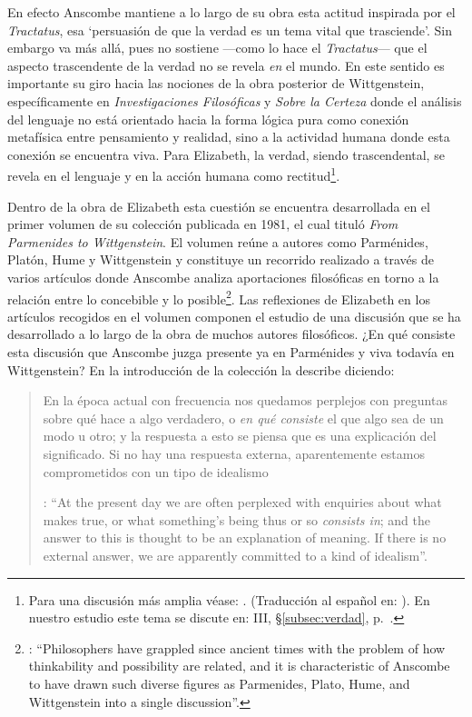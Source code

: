 En efecto Anscombe mantiene a lo largo de su obra esta actitud inspirada por el \emph{Tractatus}, esa \enquote*{persuasión de que la verdad es un tema vital que trasciende}. Sin embargo va más allá, pues no sostiene ---como lo hace el \emph{Tractatus}--- que el aspecto trascendente de la verdad no se revela \emph{en} el mundo. En este sentido es importante su giro hacia las nociones de la obra posterior de Wittgenstein, específicamente en \emph{Investigaciones Filosóficas} y \emph{Sobre la Certeza} donde el análisis del lenguaje no está orientado hacia la forma lógica pura como conexión metafísica entre pensamiento y realidad, sino a la actividad humana donde esta conexión se encuentra viva. Para Elizabeth, la verdad, siendo trascendental, se revela en el lenguaje y en la acción humana como rectitud\footnote{Para una discusión más amplia véase: \Cite{anscombe2011plato:unitytruth}. (Traducción al español en: \Cite{torralbaynubiola2005fayeh:unidadverdad}). En nuestro estudio este tema se discute en: III, \S\ref{subsec:verdad}, p.~\pageref{subsec:verdad}.}.

Dentro de la obra de Elizabeth esta cuestión se encuentra desarrollada en el primer volumen de su colección publicada en 1981, el cual tituló \emph{From Parmenides to Wittgenstein}. El volumen reúne a autores como Parménides, Platón, Hume y Wittgenstein y constituye un recorrido realizado a través de varios artículos donde Anscombe analiza aportaciones filosóficas en torno a la relación entre lo concebible y lo posible\footnote{\cite[Cf.][193]{teichmann2008ans}: \enquote{Philosophers have grappled since ancient times with the problem of how thinkability and possibility are related, and it is characteristic of Anscombe to have drawn such diverse figures as Parmenides, Plato, Hume, and Wittgenstein into a single discussion}.}. Las reflexiones de Elizabeth en los artículos recogidos en el volumen componen el estudio de una discusión que se ha desarrollado a lo largo de la obra de muchos autores filosóficos. ¿En qué consiste esta discusión que Anscombe juzga presente ya en Parménides y viva todavía en Wittgenstein? En la introducción de la colección la describe diciendo: 
\blockquote[{\Cite[Introduction, xi]{anscombe1981parmenides}}: \enquote{At the present day we are often perplexed with enquiries about what makes true, or what something's being thus or so \emph{consists in}; and the answer to this is thought to be an explanation of meaning. If there is no external answer, we are apparently committed to a kind of idealism}.]{En la época actual con frecuencia nos quedamos perplejos con preguntas sobre qué hace a algo verdadero, o \emph{en qué consiste} el que algo sea de un modo u otro; y la respuesta a esto se piensa que es una explicación del significado. Si no hay una respuesta externa, aparentemente estamos comprometidos con un tipo de idealismo}.\label{subsec:intextq}

